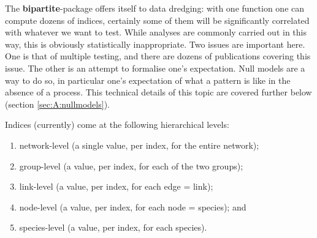 \documentclass[a4paper, 11pt]{article}\usepackage[]{graphicx}\usepackage[]{color}
\newcommand{\package}[1]{\textbf{#1}}
\begin{document}
The \package{bipartite}-package offers itself to data dredging: with one function one can compute dozens of indices, certainly some of them will be significantly correlated with whatever we want to test. While analyses are commonly carried out in this way, this is obviously statistically inappropriate. Two issues are important here. One is that of multiple testing, and there are dozens of publications covering this issue. The other is an attempt to formalise one's expectation. Null models are a way to do so, in particular one's expectation of what a pattern is like in the absence of a process. This technical details of this topic are covered further below (section \ref{sec:A:nullmodels}). 

Indices (currently) come at the following hierarchical levels:
\begin{enumerate}
\item network-level (a single value, per index, for the entire network);
\item group-level  (a value, per index, for each of the two groups);
\item link-level  (a value, per index, for each edge = link);
\item node-level (a value, per index, for each node = species); and
\item species-level (a value, per index, for each species).
\end{enumerate}
\end{document}
